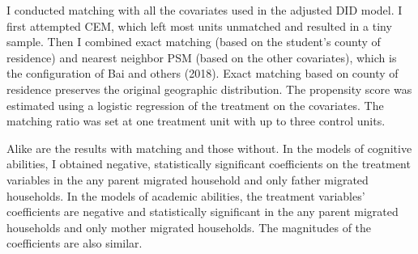 \documentclass[
  man,floatsintext]{apa7}
\begin{document}
I conducted matching with all the covariates used in the adjusted DID model. I first attempted CEM, which left most units unmatched and resulted in a tiny sample. Then I combined exact matching (based on the student's county of residence) and nearest neighbor PSM (based on the other covariates), which is the configuration of Bai and others (2018). Exact matching based on county of residence preserves the original geographic distribution. The propensity score was estimated using a logistic regression of the treatment on the covariates. The matching ratio was set at one treatment unit with up to three control units.

Alike are the results with matching and those without. In the models of cognitive abilities, I obtained negative, statistically significant coefficients on the treatment variables in the any parent migrated household and only father migrated households. In the models of academic abilities, the treatment variables' coefficients are negative and statistically significant in the any parent migrated households and only mother migrated households. The magnitudes of the coefficients are also similar.
\end{document}
